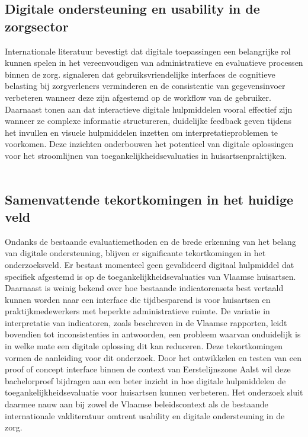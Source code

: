 \subsection{Digitale ondersteuning en usability in de zorgsector}
\label{ter:Digitale ondersteuning en usability in de zorgsector}
Internationale literatuur bevestigt dat digitale toepassingen een belangrijke rol kunnen spelen in het vereenvoudigen van administratieve en evaluatieve processen binnen de zorg.
\textcite{Romaric2025} signaleren dat gebruiksvriendelijke interfaces de cognitieve belasting bij zorgverleners verminderen en de consistentie van gegevensinvoer verbeteren wanneer deze zijn afgestemd op de workflow van de gebruiker.
Daarnaast tonen \textcite{Langote2024} aan dat interactieve digitale hulpmiddelen vooral effectief zijn wanneer ze complexe informatie structureren, duidelijke feedback geven tijdens het invullen en visuele hulpmiddelen inzetten om interpretatieproblemen te voorkomen.
Deze inzichten onderbouwen het potentieel van digitale oplossingen voor het stroomlijnen van toegankelijkheidsevaluaties in huisartsenpraktijken.
\\\\
\subsection{Samenvattende tekortkomingen in het huidige veld}
\label{ter:Samenvattende tekortkomingen in het huidige veld}
Ondanks de bestaande evaluatiemethoden en de brede erkenning van het belang van digitale ondersteuning, blijven er significante tekortkomingen in het onderzoeksveld.
Er bestaat momenteel geen gevalideerd digitaal hulpmiddel dat specifiek afgestemd is op de toegankelijkheidsevaluaties van Vlaamse huisartsen.
Daarnaast is weinig bekend over hoe bestaande indicatorensets best vertaald kunnen worden naar een interface die tijdbesparend is voor huisartsen en praktijkmedewerkers met beperkte administratieve ruimte.
De variatie in interpretatie van indicatoren, zoals beschreven in de Vlaamse rapporten, leidt bovendien tot inconsistenties in antwoorden, een probleem waarvan onduidelijk is in welke mate een digitale oplossing dit kan reduceren.
Deze tekortkomingen vormen de aanleiding voor dit onderzoek.
Door het ontwikkelen en testen van een proof of concept interface binnen de context van Eerstelijnszone Aalst wil deze bachelorproef bijdragen aan een beter inzicht in hoe digitale hulpmiddelen de toegankelijkheidsevaluatie voor huisartsen kunnen verbeteren.
Het onderzoek sluit daarmee nauw aan bij zowel de Vlaamse beleidscontext als de bestaande internationale vakliteratuur omtrent usability en digitale ondersteuning in de zorg.
